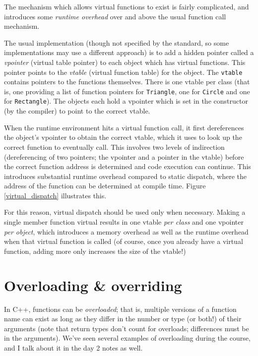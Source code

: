 \documentclass[a4paper]{scrartcl}
\begin{document}
The mechanism which allows virtual functions to exist is fairly complicated, and introduces some \emph{runtime overhead} over and above the usual function call mechanism.

The usual implementation (though not specified by the standard, so some implementations may use a different approach) is to add a hidden pointer called a \emph{vpointer} (virtual table pointer) to each object which has virtual functions. This pointer points to the \emph{vtable} (virtual function table) for the object. The \verb|vtable| contains pointers to the functions themselves. There is one vtable per class (that is, one providing a list of function pointers for \verb|Triangle|, one for \verb|Circle| and one for \verb|Rectangle|). The objects each hold a vpointer which is set in the constructor (by the compiler) to point to the correct vtable.

When the runtime environment hits a virtual function call, it first dereferences the object's vpointer to obtain the correct vtable, which it uses to look up the correct function to eventually call. This involves two levels of indirection (dereferencing of two pointers; the vpointer and a pointer in the vtable) before the correct function address is determined and code execution can continue. This introduces substantial runtime overhead compared to static dispatch, where the address of the function can be determined at compile time. Figure \ref{virtual_dispatch} illustrates this.

For this reason, virtual dispatch should be used only when necessary. Making a single member function virtual results in one vtable \emph{per class} and one vpointer \emph{per object}, which introduces a memory overhead as well as the runtime overhead when that virtual function is called (of course, once you already have a virtual function, adding more only increases the size of the vtable!)

\section{Overloading \& overriding}
In C++, functions can be \emph{overloaded}; that is, multiple versions of a function name can exist as long as they differ in the number or type (or both!) of their arguments (note that return types don't count for overloads; differences must be in the arguments). We've seen several examples of overloading during the course, and I talk about it in the day 2 notes as well.
\end{document}
